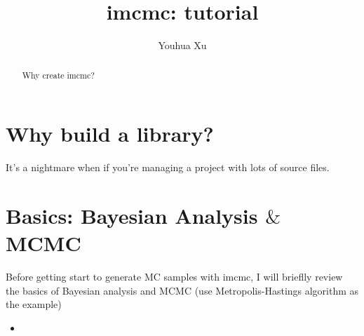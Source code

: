 \documentclass[a4paper,11pt]{article}
\newcommand{\insertcode}[2]{\begin{itemize}\item[]\end{itemize}}
\begin{document}
    
\title{imcmc: tutorial}

\author[1,2]{Youhua Xu}

\maketitle

\begin{abstract}
Why create imcmc?
\end{abstract}

\maketitle

\section{Why build a library?}
It's a nightmare when if you're managing a project with lots of source files.

\section{Basics: Bayesian Analysis $\&$ MCMC}
Before getting start to generate MC samples with imcmc, I will brieflly
review the basics of Bayesian analysis and MCMC (use Metropolis-Hastings
algorithm as the example)


%
%
%
%
%
%
%
%


\insertcode{"../examples/gaussian.cpp"}{Example of a multi-dimensional Gaussian likelihood distribution.} %

\end{document}
